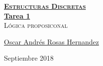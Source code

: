 \documentclass[12pt, fleqn]{article}                            %
\author{Oscar Andrés Rosas}                                     %
\theoremstyle{break}                                            %
\begin{document}
\begin{titlepage}
    
    \pagecolor{TitlePageColor}                                      %
    \color{white}                                                   %

    \vspace                                                         %
    \baselineskip                                                   %

    \makebox[0pt][l]{\rule{1.3\textwidth}{3pt}}                     %
    
    \href{https://compilandoconocimiento.com}                       %
    {\textbf{\textsc{\Huge Estructuras Discretas}}}\\[2.7cm]      %

    \href{\ProjectNameLink}                                         %
    {\fontsize{45}{52}\selectfont \textbf{Tarea 1}}\\[0.5cm]        %
    \textcolor{ColorSubtext}{\textsc{\Huge Lógica proposiconal}}     %
    
    \vfill                                                          %
    
    \href{\ProjectAuthorLink}                                       %
    {\LARGE \textsf{Oscar Andrés Rosas Hernandez}}                  %

    \vspace                                                         %
    \baselineskip                                                   %
    
    {\large \textsf{Septiembre 2018}}                                    %

\end{titlepage}
\end{document}
